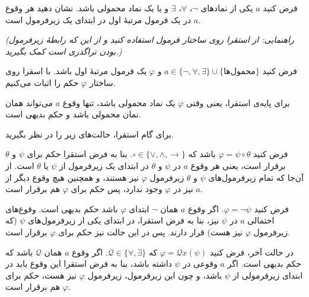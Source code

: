 فرض کنید $a$ یکی از نمادهای $\neg$، $\forall$، $\exists$ و یا یک نماد محمولی باشد. نشان دهید هر وقوع $a$ در یک فرمول مرتبهٔ اول در ابتدای یک زیرفرمول است.

\emph{(راهنمایی: از استقرا روی ساختار فرمول استفاده کنید و از این که رابطهٔ زیرفرمول بودن تراگذری است کمک بگیرید.)}
\begin{ans}
  فرض کنید $a \in \{\neg, \forall, \exists\} \cup \{\text{محمول‌ها}\}$ و $\varphi$ یک فرمول مرتبهٔ اول باشد. با اسقرا روی ساختار $\varphi$ حکم را اثبات می‌کنیم.

  برای پایه‌ی استقرا، یعنی وقتی $\varphi$ یک نماد محمولی باشد، تنها وقوع $a$ می‌تواند همان نمان محمولی باشد و حکم بدیهی است.

  برای گام استقرا، حالت‌های زیر را در نظر بگیرید.
  
  فرض کنید $\varphi = \psi \circ \theta$ باشد که $\circ \in \{\vee, \wedge, \rightarrow\}$. بنا به فرض استقرا حکم برای $\psi$ و $\theta$ برقرار است، یعنی هر وقوع $a$ در $\psi$ و $\theta$ در ابتدای یک زیرفرمول از $\psi$ یا $\theta$ است. از آن‌جا که تمام زیرفرمول‌های $\psi$ و $\theta$ زیرفرمول $\varphi$ نیز هستند، و همچنین هیچ وقوع دیگر از $a$ نیز در $\varphi$ وجود ندارد، پس حکم برای $\varphi$ هم برقرار است.

  فرض کنید $\varphi = \neg \psi$. اگر وقوع $a$ همان $\neg$ ابتدای $\varphi$ باشد حکم بدیهی است. وقوع‌های احتمالی $a$ در $\psi$ نیز، بنا به فرض استقرا، در ابتدای یکی از زیرفرمول‌های $\psi$ (که زیرفرمول $\varphi$ نیز هست) قرار دارند. پس در این حالت نیز حکم برای $\varphi$ برقرار است.

  در حالت آخر، فرض کنید $\varphi = \mathcal{Q} x (\psi)$ که $\mathcal{Q} \in \{\forall, \exists\}$.
  اگر وقوع $a$ همان $\mathcal{Q}$ باشد که حکم بدیهی است. اگر $a$ وقوعی در $\psi$ داشته باشد، بنا به فرض استقرا این وقوع باید در ابتدای زیرفرمولی از $\psi$ باشد، و چون این زیرفرمول، زیرفرمول $\varphi$ نیز هست، حکم برای $\varphi$ هم برقرار است.
\end{ans}